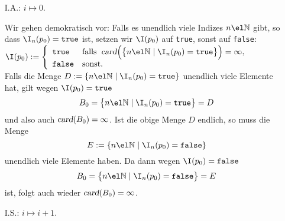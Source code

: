 \begin{enumerate}
\item[I.A.:] $i \mapsto 0$.

     Wir gehen demokratisch vor: Falls es unendlich viele Indizes $n \el \mathbb{N}$ gibt, so dass
     $\I_n(p_0) = \mathtt{true}$ ist, setzen wir $\I(p_0)$ auf \texttt{true},
     sonst auf \texttt{false}: 
      \\[0.1cm]
      \hspace*{1.3cm} 
     $
       \I(p_0) := \left\{
       \begin{array}[c]{ll}
         \mathtt{true}  & \mbox{falls}\;\; \textsl{card}\Bigl(\bigl\{ n \el \mathbb{N} \mid \I_n(p_0) = \mathtt{true}\bigr\}\Bigr) = \infty, \\
         \mathtt{false} & \mbox{sonst}.
       \end{array}
       \right.
     $
      \\[0.1cm]
      Falls die Menge  $D:=\{ n \el \mathbb{N} \mid \I_n(p_0) = \mathtt{true}\}$       unendlich
      viele Elemente hat, gilt wegen $\I(p_0) = \mathtt{true}$
    \[ B_0 = \bigl\{ n \el \mathbb{N} \mid \I_n(p_0) = \mathtt{true} \bigr\} = D \]
     und also auch $\textsl{card}(B_0) = \infty$.
     Ist die obige Menge $D$ endlich, so muss die Menge 
     \[ E:= \{ n \el \mathbb{N} \mid \I_n(p_0) = \mathtt{false}\}\]
     unendlich viele Elemente haben.   Da dann wegen $\I(p_0) = \mathtt{false}$
     \[ B_0 =\bigl\{ n \el \mathbb{N} \mid \I_n(p_0) = \mathtt{false} \bigr\} = E \]
     ist, folgt auch wieder $\textsl{card}(B_0) = \infty$.
\item[I.S.:] $i \mapsto i + 1$.


\end{enumerate}
